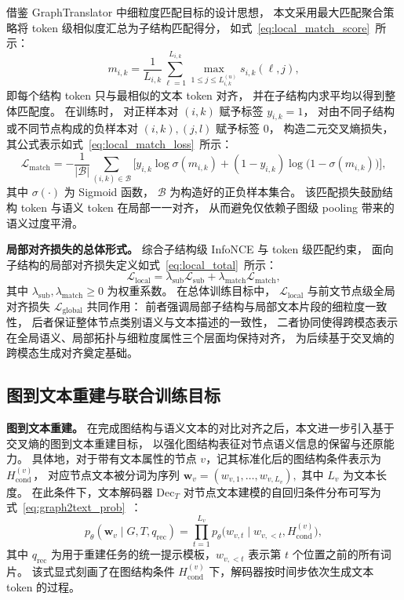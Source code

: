 借鉴 GraphTranslator \cite{Zhang2024GraphTranslatorAG}中细粒度匹配目标的设计思想，
本文采用最大匹配聚合策略将 token 级相似度汇总为子结构匹配得分，
如式~\ref{eq:local_match_score}\ 所示：
\begin{equation}
  m_{i,k}
  = \frac{1}{L_{i,k}}
    \sum_{\ell=1}^{L_{i,k}}
      \max_{1\le j \le L^{(u)}_{i,k}} s_{i,k}(\ell,j),
  \label{eq:local_match_score}
\end{equation}
即每个结构 token 只与最相似的文本 token 对齐，
并在子结构内求平均以得到整体匹配度。
在训练时，
对正样本对 \((i,k)\) 赋予标签 \(y_{i,k}=1\)，
对由不同子结构或不同节点构成的负样本对 \((i,k),(j,l)\) 赋予标签 \(0\)，
构造二元交叉熵损失，其公式表示如式~\ref{eq:local_match_loss}\ 所示：
\begin{equation}
  \mathcal{L}_{\mathrm{match}}
  = - \frac{1}{|\mathcal{B}|}
    \sum_{(i,k)\in\mathcal{B}}
    \bigl[
      y_{i,k} \log \sigma(m_{i,k})
      + (1-y_{i,k}) \log \bigl(1-\sigma(m_{i,k})\bigr)
    \bigr],
  \label{eq:local_match_loss}
\end{equation}
其中 \(\sigma(\cdot)\) 为 Sigmoid 函数，
\(\mathcal{B}\) 为构造好的正负样本集合。
该匹配损失鼓励结构 token 与语义 token 在局部一一对齐，
从而避免仅依赖子图级 pooling 带来的语义过度平滑。

\textbf{局部对齐损失的总体形式。}
综合子结构级 InfoNCE 与 token 级匹配约束，
面向子结构的局部对齐损失定义如式~\ref{eq:local_total}\ 所示：
\begin{equation}
  \mathcal{L}_{\mathrm{local}}
  = \lambda_{\mathrm{sub}} \mathcal{L}_{\mathrm{sub}}
  + \lambda_{\mathrm{match}} \mathcal{L}_{\mathrm{match}},
  \label{eq:local_total}
\end{equation}
其中 \(\lambda_{\mathrm{sub}},\lambda_{\mathrm{match}}\ge 0\) 为权重系数。
在总体训练目标中，
\(\mathcal{L}_{\mathrm{local}}\) 与前文节点级全局对齐损失
\(\mathcal{L}_{\mathrm{global}}\) 共同作用：
前者强调局部子结构与局部文本片段的细粒度一致性，
后者保证整体节点类别语义与文本描述的一致性，
二者协同使得跨模态表示在全局语义、局部拓扑与细粒度属性三个层面均保持对齐，
为后续基于交叉熵的跨模态生成对齐奠定基础。



\subsection{图到文本重建与联合训练目标}
\textbf{图到文本重建。}
在完成图结构与语义文本的对比对齐之后，本文进一步引入基于交叉熵的图到文本重建目标，
以强化图结构表征对节点语义信息的保留与还原能力。
具体地，对于带有文本属性的节点 $v$，记其标准化后的图结构条件表示为 $H_{\mathrm{cond}}^{(v)}$，
对应节点文本被分词为序列
\(
\mathbf{w}_v = (w_{v,1},\dots,w_{v,L_v}),
\)
其中 $L_v$ 为文本长度。
在此条件下，文本解码器 $\mathrm{Dec}_T$ 对节点文本建模的自回归条件分布可写为
式~\ref{eq:graph2text_prob}\ ：
\begin{equation}
  p_\theta(\mathbf{w}_v \mid G,T,q_{\mathrm{rec}})
  =
  \prod_{t=1}^{L_v}
  p_\theta\big(w_{v,t} \mid w_{v,<t}, H_{\mathrm{cond}}^{(v)}\big),
  \label{eq:graph2text_prob}
\end{equation}
其中 $q_{\mathrm{rec}}$ 为用于重建任务的统一提示模板，$w_{v,<t}$ 表示第 $t$ 个位置之前的所有词片。
该式显式刻画了在图结构条件 $H_{\mathrm{cond}}^{(v)}$ 下，解码器按时间步依次生成文本 token 的过程。

